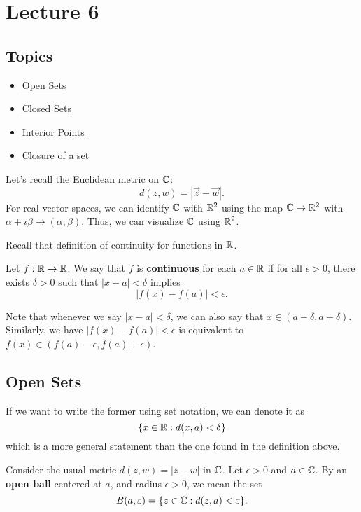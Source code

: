 \documentclass[a4paper]{report}
\begin{document}
    
\rhead{\thepage}

\section{Lecture 6}

\subsection{Topics}

\begin{itemize}
    \item {\hyperref[Open Sets]{Open Sets}} 
    \item {\hyperref[Closed Sets]{Closed Sets}}
    \item {\hyperref[Interior Points]{Interior Points}} 
    \item {\hyperref[Closure of a set]{Closure of a set}} 
\end{itemize}

Let's recall the Euclidean metric on \( \mathbb{C}  \):
\[  d(z,w) = | \vec{ z }  - \vec{ w }   |.  \]
For real vector spaces, we can identify \( \mathbb{C}  \) with \( \mathbb{R}^{2} \) using the map \( \mathbb{C} \to \mathbb{R}^{2}  \) with \( \alpha + i \beta \to (\alpha, \beta) \). Thus, we can visualize \( \mathbb{C}  \) using \( \mathbb{R}^{2} \).

Recall that definition of continuity for functions in \( \R  \).

\begin{definition}[continuity in \( \R  \)]
    Let \( f: \mathbb{R} \to \mathbb{R}  \). We say that \( f  \) is \textbf{continuous} for each \( a \in \mathbb{R}  \) if for all \( \epsilon > 0 \), there exists \( \delta > 0  \) such that \( | x - a  |  < \delta \) implies
    \[  | f(x) - f(a) |  < \epsilon. \]
\end{definition}

Note that whenever we say \( | x - a  |  < \delta  \), we can also say that \( x \in (a - \delta, a + \delta) \). Similarly, we have \( | f(x) - f(a) | < \epsilon  \) is equivalent to \( f(x) \in (f(a) - \epsilon, f(a) + \epsilon) \).

\subsection{Open Sets} \label{Open Sets}

If we want to write the former using set notation, we can denote it as 
\[  \{ x \in \mathbb{R} : d(x,a) < \delta \}  \]
which is a more general statement than the one found in the definition above.
\begin{definition}
  Consider the usual metric \( d(z,w) = | z - w  |   \) in \( \mathbb{C}  \). Let \( \epsilon > 0  \) and \( a \in \mathbb{C}  \). By an \textbf{open ball} centered at \( a  \), and radius \( \epsilon > 0  \), we mean the set
  \[ B(a,\varepsilon)  =  \{ z \in \mathbb{C} : d(z,a) < \varepsilon \}. \]
\end{definition}
\end{document}
